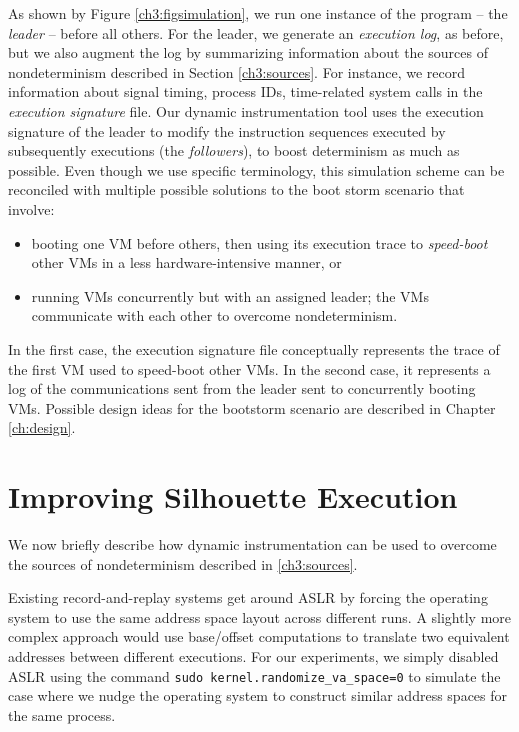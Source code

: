 As shown by Figure \ref{ch3:figsimulation}, we run one instance of the
program -- the {\em leader} -- before all others.
For the leader, we generate an {\em execution log}, as before,
but we also augment the log by summarizing information about the sources of nondeterminism
described in Section \ref{ch3:sources}. For instance, we record
information about signal timing, process IDs, time-related system calls
in the {\em execution signature} file. Our dynamic instrumentation tool
uses the execution signature of the leader
to modify the instruction sequences executed by subsequently
executions (the {\em followers}), to boost determinism as much as possible.
Even though we use specific terminology, this simulation scheme can be
reconciled with multiple possible solutions to the 
boot storm scenario that involve:
\begin{itemize}
\item
booting one VM before others,
then using its execution trace to {\em speed-boot} other VMs
in a less hardware-intensive manner, or
\item 
running VMs concurrently but with an assigned leader;
the VMs communicate with each other to overcome
nondeterminism.
\end{itemize}

In the first case, the execution signature file
conceptually represents the trace of the first VM used to speed-boot
other VMs. In the second case, it represents a log of the communications 
sent from the leader sent to concurrently booting VMs. Possible
design ideas for the bootstorm scenario are described 
in Chapter \ref{ch:design}.

\section{Improving Silhouette Execution} \label{silimprove}
We now briefly describe how dynamic instrumentation can be used to overcome
the sources of nondeterminism described in \ref{ch3:sources}. \newline

 \newline
Existing record-and-replay systems get around ASLR by
forcing the operating system to use the same address space layout across
different runs. A slightly more complex approach 
would use base/offset computations to translate two equivalent 
addresses between different executions. 
For our experiments, we simply disabled ASLR using the command
\texttt {sudo kernel.randomize\_va\_space=0} to simulate the 
case where we nudge the operating system to construct
similar address spaces for the same process. \newline


